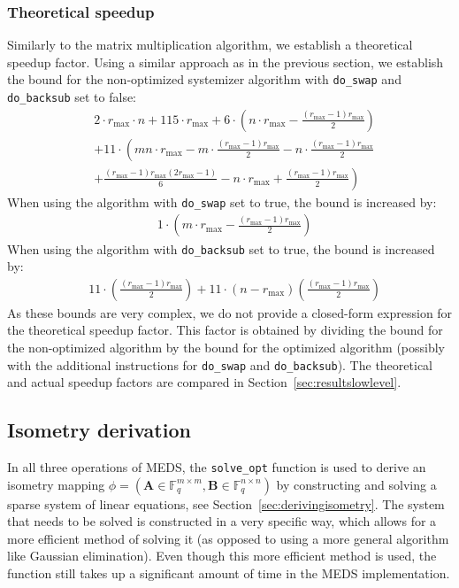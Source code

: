 \documentclass[11pt,a4paper]{report}
\theoremstyle{definition}
\begin{document}
\subsubsection{Theoretical speedup}
Similarly to the matrix multiplication algorithm, we establish a theoretical speedup factor. Using a similar approach as in the previous section, we establish the bound for the non-optimized systemizer algorithm with \texttt{do\_swap} and \texttt{do\_backsub} set to false:
\begin{align*}
   & 2 \cdot r_\text{max} \cdot n + 115 \cdot r_\text{max} + 6 \cdot \left( n \cdot r_\text{max} - \frac{(r_\text{max} - 1)r_{\text{max}}}{2} \right)          \\
   & + 11 \cdot \left( mn \cdot r_\text{max} - m \cdot \frac{(r_\text{max} - 1)r_{\text{max}}}{2} - n \cdot \frac{(r_\text{max} - 1)r_{\text{max}}}{2} \right. \\
   & \left. + \frac{(r_\text{max} - 1)r_{\text{max}}(2r_{\text{max}} - 1)}{6} - n \cdot r_\text{max} + \frac{(r_\text{max} - 1)r_{\text{max}}}{2} \right)
\end{align*}
When using the algorithm with \texttt{do\_swap} set to true, the bound is increased by:
\begin{align*}
   & 1 \cdot \left( m \cdot r_\text{max} - \frac{(r_\text{max} - 1)r_{\text{max}}}{2} \right)
\end{align*}
When using the algorithm with \texttt{do\_backsub} set to true, the bound is increased by:
\begin{align*}
   & 11 \cdot \left( \frac{(r_\text{max} - 1)r_{\text{max}}}{2} \right) + 11 \cdot \left( n - r_\text{max} \right) \left( \frac{(r_\text{max} - 1)r_{\text{max}}}{2} \right)
\end{align*}
As these bounds are very complex, we do not provide a closed-form expression for the theoretical speedup factor. This factor is obtained by dividing the bound for the non-optimized algorithm by the bound for the optimized algorithm (possibly with the additional instructions for \texttt{do\_swap} and \texttt{do\_backsub}). The theoretical and actual speedup factors are compared in Section~\ref{sec:resultslowlevel}.

\subsection{Isometry derivation}
\label{sec:isometryderivation}
In all three operations of MEDS, the \texttt{solve\_opt} function is used to derive an isometry mapping $\phi = (\textbf{A} \in \mathbb{F}_q^{m \times m}, \textbf{B} \in \mathbb{F}_q^{n \times n})$ by constructing and solving a sparse system of linear equations, see Section~\ref{sec:derivingisometry}. The system that needs to be solved is constructed in a very specific way, which allows for a more efficient method of solving it (as opposed to using a more general algorithm like Gaussian elimination). Even though this more efficient method is used, the function still takes up a significant amount of time in the MEDS implementation.
\end{document}

